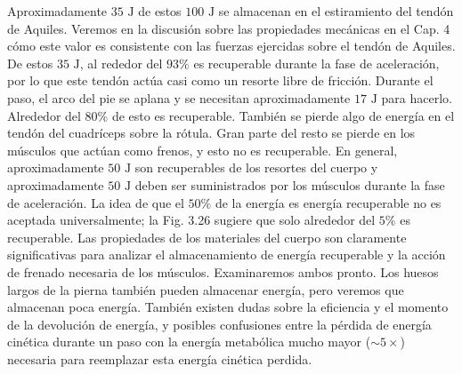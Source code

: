 \documentclass[12pt]{book}
\begin{document}
Aproximadamente $35\text{ J}$ de estos $100\text{ J}$ se almacenan en el estiramiento del tendón de Aquiles. Veremos en la discusión sobre las propiedades mecánicas en el Cap. 4 cómo este valor es consistente con las fuerzas ejercidas sobre el tendón de Aquiles. De estos $35\text{ J}$, al rededor del $93\%$ es recuperable durante la fase de aceleración, por lo que este tendón actúa casi como un resorte libre de fricción. Durante el paso, el arco del pie se aplana y se necesitan aproximadamente $17\text{ J}$ para hacerlo. Alrededor del $80\%$ de esto es recuperable. También se pierde algo de energía en el tendón del cuadríceps sobre la rótula. Gran parte del resto se pierde en los músculos que actúan como frenos, y esto no es recuperable. En general, aproximadamente $50\text{ J}$ son recuperables de los resortes del cuerpo y aproximadamente $50\text{ J}$ deben ser suministrados por los músculos durante la fase de aceleración. La idea de que el $50\%$ de la energía es energía recuperable no es aceptada universalmente; la Fig. 3.26 sugiere que solo alrededor del $5\%$ es recuperable. Las propiedades de los materiales del cuerpo son claramente significativas para analizar el almacenamiento de energía recuperable y la acción de frenado necesaria de los músculos. Examinaremos ambos pronto. Los huesos largos de la pierna también pueden almacenar energía, pero veremos que almacenan poca energía. También existen dudas sobre la eficiencia y el momento de la devolución de energía, y posibles confusiones entre la pérdida de energía cinética durante un paso con la energía metabólica mucho mayor ($\sim 5\times$) necesaria para reemplazar esta energía cinética perdida.
\end{document}
